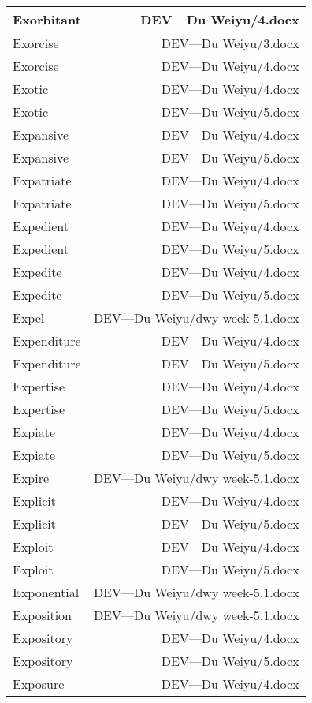 \documentclass{article}
\begin{document}
\begin{center}
\begin{longtable}{|l|r|}
Exorbitant  &  DEV---Du Weiyu/4.docx\\  
\hline
Exorcise  &  DEV---Du Weiyu/3.docx\\  
\hline
Exorcise  &  DEV---Du Weiyu/4.docx\\  
\hline
Exotic  &  DEV---Du Weiyu/4.docx\\  
\hline
Exotic  &  DEV---Du Weiyu/5.docx\\  
\hline
Expansive  &  DEV---Du Weiyu/4.docx\\  
\hline
Expansive  &  DEV---Du Weiyu/5.docx\\  
\hline
Expatriate  &  DEV---Du Weiyu/4.docx\\  
\hline
Expatriate  &  DEV---Du Weiyu/5.docx\\  
\hline
Expedient  &  DEV---Du Weiyu/4.docx\\  
\hline
Expedient  &  DEV---Du Weiyu/5.docx\\  
\hline
Expedite  &  DEV---Du Weiyu/4.docx\\  
\hline
Expedite  &  DEV---Du Weiyu/5.docx\\  
\hline
Expel  &  DEV---Du Weiyu/dwy week-5.1.docx\\  
\hline
Expenditure  &  DEV---Du Weiyu/4.docx\\  
\hline
Expenditure  &  DEV---Du Weiyu/5.docx\\  
\hline
Expertise  &  DEV---Du Weiyu/4.docx\\  
\hline
Expertise  &  DEV---Du Weiyu/5.docx\\  
\hline
Expiate  &  DEV---Du Weiyu/4.docx\\  
\hline
Expiate  &  DEV---Du Weiyu/5.docx\\  
\hline
Expire  &  DEV---Du Weiyu/dwy week-5.1.docx\\  
\hline
Explicit  &  DEV---Du Weiyu/4.docx\\  
\hline
Explicit  &  DEV---Du Weiyu/5.docx\\  
\hline
Exploit  &  DEV---Du Weiyu/4.docx\\  
\hline
Exploit  &  DEV---Du Weiyu/5.docx\\  
\hline
Exponential  &  DEV---Du Weiyu/dwy week-5.1.docx\\  
\hline
Exposition  &  DEV---Du Weiyu/dwy week-5.1.docx\\  
\hline
Expository  &  DEV---Du Weiyu/4.docx\\  
\hline
Expository  &  DEV---Du Weiyu/5.docx\\  
\hline
Exposure  &  DEV---Du Weiyu/4.docx\\  

\end{longtable}
\end{center}
\end{document}
